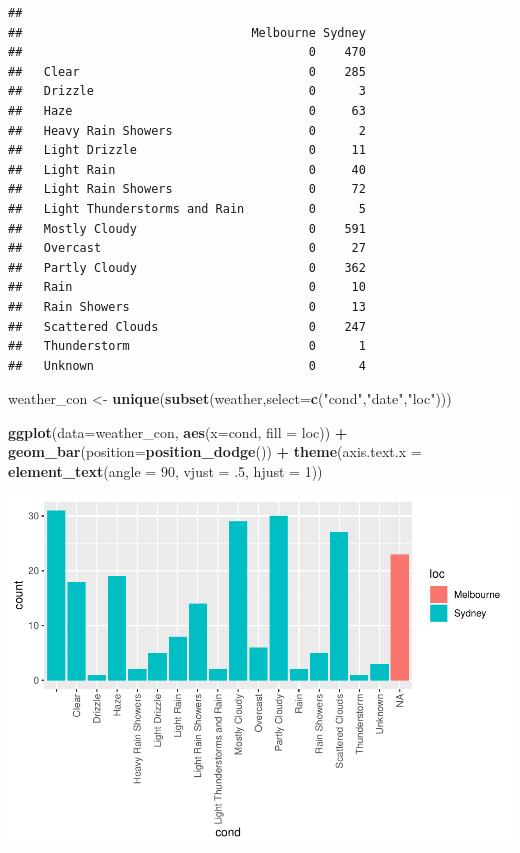 \documentclass[]{article}
\newenvironment{Shaded}{\begin{snugshade}}{\end{snugshade}}
\newcommand{\DataTypeTok}[1]{\textcolor[rgb]{0.13,0.29,0.53}{#1}}
\newcommand{\DecValTok}[1]{\textcolor[rgb]{0.00,0.00,0.81}{#1}}
\newcommand{\FloatTok}[1]{\textcolor[rgb]{0.00,0.00,0.81}{#1}}
\newcommand{\KeywordTok}[1]{\textcolor[rgb]{0.13,0.29,0.53}{\textbf{#1}}}
\newcommand{\NormalTok}[1]{#1}
\newcommand{\OperatorTok}[1]{\textcolor[rgb]{0.81,0.36,0.00}{\textbf{#1}}}
\newcommand{\StringTok}[1]{\textcolor[rgb]{0.31,0.60,0.02}{#1}}
\begin{document}
\begin{verbatim}
##                               
##                                Melbourne Sydney
##                                        0    470
##   Clear                                0    285
##   Drizzle                              0      3
##   Haze                                 0     63
##   Heavy Rain Showers                   0      2
##   Light Drizzle                        0     11
##   Light Rain                           0     40
##   Light Rain Showers                   0     72
##   Light Thunderstorms and Rain         0      5
##   Mostly Cloudy                        0    591
##   Overcast                             0     27
##   Partly Cloudy                        0    362
##   Rain                                 0     10
##   Rain Showers                         0     13
##   Scattered Clouds                     0    247
##   Thunderstorm                         0      1
##   Unknown                              0      4
\end{verbatim}

\begin{Shaded}
\begin{Highlighting}[]
\NormalTok{weather_con <-}\StringTok{ }\KeywordTok{unique}\NormalTok{(}\KeywordTok{subset}\NormalTok{(weather,}\DataTypeTok{select=}\KeywordTok{c}\NormalTok{(}\StringTok{"cond"}\NormalTok{,}\StringTok{"date"}\NormalTok{,}\StringTok{"loc"}\NormalTok{)))}

\KeywordTok{ggplot}\NormalTok{(}\DataTypeTok{data=}\NormalTok{weather_con, }\KeywordTok{aes}\NormalTok{(}\DataTypeTok{x=}\NormalTok{cond, }\DataTypeTok{fill =}\NormalTok{ loc)) }\OperatorTok{+}
\StringTok{    }\KeywordTok{geom_bar}\NormalTok{(}\DataTypeTok{position=}\KeywordTok{position_dodge}\NormalTok{()) }\OperatorTok{+}
\StringTok{    }\KeywordTok{theme}\NormalTok{(}\DataTypeTok{axis.text.x =} \KeywordTok{element_text}\NormalTok{(}\DataTypeTok{angle =} \DecValTok{90}\NormalTok{, }\DataTypeTok{vjust =} \FloatTok{.5}\NormalTok{, }\DataTypeTok{hjust =} \DecValTok{1}\NormalTok{))}
\end{Highlighting}
\end{Shaded}

\includegraphics{AT2_template__medium__files/figure-latex/unnamed-chunk-12-1.pdf}
\end{document}
